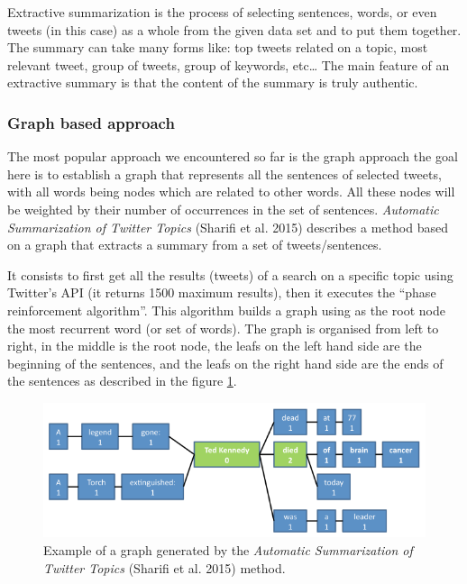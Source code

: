 \documentclass[runningheads]{llncs}
\begin{document}
Extractive summarization is the process of selecting sentences, words, or even
tweets (in this case) as a whole from the given data set and to put them
together. The summary can take many forms like: top tweets related on a topic,
most relevant tweet, group of tweets, group of keywords, etc… The main
feature of an extractive summary is that the content of the summary is truly
authentic.

\subsubsection{Graph based approach}

The most popular approach we encountered so far is the graph approach the goal
here is to establish a graph that represents all the sentences of selected
tweets, with all words being nodes which are related to other words.
All these nodes will be weighted by their number of occurrences in the set of
sentences. \textit{Automatic Summarization of Twitter Topics} (Sharifi et al.
2015) \cite{sharifi_automatic_nodate} describes a method based on a graph that
extracts a summary from a set of tweets/sentences.

It consists to first get all the results (tweets) of a search on a specific
topic using Twitter’s API (it returns 1500 maximum results), then it executes
the ``phase reinforcement algorithm''. This algorithm builds a graph using as
the root node the most recurrent word (or set of words). The graph is organised
from left to right, in the middle is the root node, the leafs on the left hand
side are the beginning of the sentences, and the leafs on the right hand side
are the ends of the sentences as described in the figure \ref{fig:fig1}.

\begin{figure}[H]
    \includegraphics[width=\textwidth]{fig1.png}
    \caption{Example of a graph generated by the \textit{Automatic Summarization
    of Twitter Topics} (Sharifi et al. 2015) \cite{sharifi_automatic_nodate}
    method.}
    \label{fig:fig1}
\end{figure}
\end{document}
